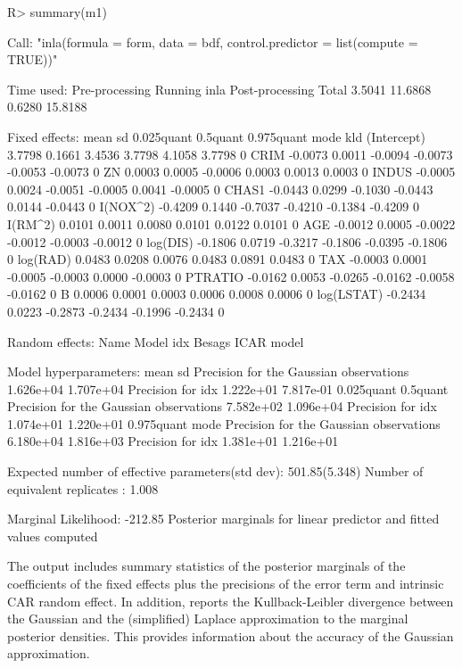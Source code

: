 \documentclass[article]{jss}
\begin{document}
\begin{Schunk}
\begin{Sinput}
R> summary(m1)
\end{Sinput}
\begin{Soutput}
Call:
"inla(formula = form, data = bdf, control.predictor = list(compute = TRUE))"

Time used:
 Pre-processing    Running inla Post-processing           Total 
         3.5041         11.6868          0.6280         15.8188 

Fixed effects:
               mean     sd 0.025quant 0.5quant 0.975quant    mode kld
(Intercept)  3.7798 0.1661     3.4536   3.7798     4.1058  3.7798   0
CRIM        -0.0073 0.0011    -0.0094  -0.0073    -0.0053 -0.0073   0
ZN           0.0003 0.0005    -0.0006   0.0003     0.0013  0.0003   0
INDUS       -0.0005 0.0024    -0.0051  -0.0005     0.0041 -0.0005   0
CHAS1       -0.0443 0.0299    -0.1030  -0.0443     0.0144 -0.0443   0
I(NOX^2)    -0.4209 0.1440    -0.7037  -0.4210    -0.1384 -0.4209   0
I(RM^2)      0.0101 0.0011     0.0080   0.0101     0.0122  0.0101   0
AGE         -0.0012 0.0005    -0.0022  -0.0012    -0.0003 -0.0012   0
log(DIS)    -0.1806 0.0719    -0.3217  -0.1806    -0.0395 -0.1806   0
log(RAD)     0.0483 0.0208     0.0076   0.0483     0.0891  0.0483   0
TAX         -0.0003 0.0001    -0.0005  -0.0003     0.0000 -0.0003   0
PTRATIO     -0.0162 0.0053    -0.0265  -0.0162    -0.0058 -0.0162   0
B            0.0006 0.0001     0.0003   0.0006     0.0008  0.0006   0
log(LSTAT)  -0.2434 0.0223    -0.2873  -0.2434    -0.1996 -0.2434   0

Random effects:
Name	  Model
 idx   Besags ICAR model 

Model hyperparameters:
                                        mean      sd       
Precision for the Gaussian observations 1.626e+04 1.707e+04
Precision for idx                       1.222e+01 7.817e-01
                                        0.025quant 0.5quant 
Precision for the Gaussian observations 7.582e+02  1.096e+04
Precision for idx                       1.074e+01  1.220e+01
                                        0.975quant mode     
Precision for the Gaussian observations 6.180e+04  1.816e+03
Precision for idx                       1.381e+01  1.216e+01

Expected number of effective parameters(std dev): 501.85(5.348)
Number of equivalent replicates : 1.008 

Marginal Likelihood:  -212.85 
Posterior marginals for linear predictor and fitted values computed
\end{Soutput}
\end{Schunk}
\noindent
The output includes summary statistics of the posterior marginals of the
coefficients of the fixed effects plus the precisions of the error term and
intrinsic CAR random effect. In addition,  reports the
Kullback-Leibler divergence between the Gaussian and the (simplified)
Laplace approximation to the marginal posterior densities. This provides
information about the accuracy of the Gaussian approximation. 
\end{document}
